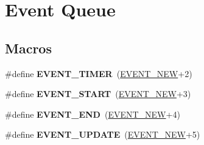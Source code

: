 \hypertarget{group__event__queue}{}\section{Event Queue}
\label{group__event__queue}
\subsection*{Macros}
\begin{DoxyCompactItemize}
\item 
\mbox{\label{group__event__queue_gaff84eb9632fc20086dd9853d249b39ec}} 
\#define {\bfseries E\+V\+E\+N\+T\+\_\+\+T\+I\+M\+ER}~(\hyperlink{group__event_gga2628ea8d12e8b2563c32f05dc7fff6faa747b63b45296ad40109256f1a3c93bb7}{E\+V\+E\+N\+T\+\_\+\+N\+EW}+2)
\item 
\mbox{\label{group__event__queue_ga813ea155658c016a7c9b69e3418e5d0a}} 
\#define {\bfseries E\+V\+E\+N\+T\+\_\+\+S\+T\+A\+RT}~(\hyperlink{group__event_gga2628ea8d12e8b2563c32f05dc7fff6faa747b63b45296ad40109256f1a3c93bb7}{E\+V\+E\+N\+T\+\_\+\+N\+EW}+3)
\item 
\mbox{\label{group__event__queue_ga17320346a282fc1dc697bb25278ca1be}} 
\#define {\bfseries E\+V\+E\+N\+T\+\_\+\+E\+ND}~(\hyperlink{group__event_gga2628ea8d12e8b2563c32f05dc7fff6faa747b63b45296ad40109256f1a3c93bb7}{E\+V\+E\+N\+T\+\_\+\+N\+EW}+4)
\item 
\mbox{\label{group__event__queue_ga5250420b845f38502703f9b84753021f}} 
\#define {\bfseries E\+V\+E\+N\+T\+\_\+\+U\+P\+D\+A\+TE}~(\hyperlink{group__event_gga2628ea8d12e8b2563c32f05dc7fff6faa747b63b45296ad40109256f1a3c93bb7}{E\+V\+E\+N\+T\+\_\+\+N\+EW}+5)
\end{DoxyCompactItemize}
